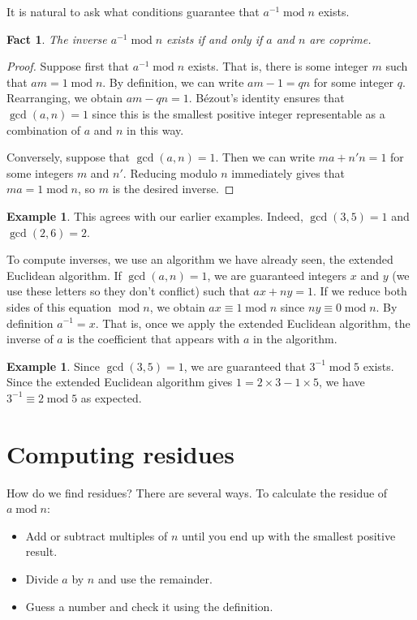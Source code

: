\documentclass{book}
\theoremstyle{plain}
\newtheorem{fact}[theorem]{Fact}
\theoremstyle{definition}
\newtheorem{example}[theorem]{Example}
\renewcommand{\mod}{\operatorname{mod}}
\renewcommand{\mod}{\operatorname{mod}}
\begin{document}
It is natural to ask what conditions guarantee that $a^{-1} \mod n$ exists.

\begin{fact}
The inverse $a^{-1} \mod n$ exists if and only if $a$ and $n$ are coprime.
\end{fact}

\begin{proof}
Suppose first that $a^{-1} \mod n$ exists. That is, there is some integer $m$ such that $am = 1 \mod n$. By definition, we can write $am-1=qn$ for some integer $q$. Rearranging, we obtain $am-qn=1$. B\'{e}zout's identity ensures that $\gcd(a,n) = 1$ since this is the smallest positive integer representable as a combination of $a$ and $n$ in this way.

Conversely, suppose that $\gcd(a,n) = 1$. Then we can write $ma+n'n=1$ for some integers $m$ and $n'$. Reducing modulo $n$ immediately gives that $ma = 1 \mod n$, so $m$ is the desired inverse.
\end{proof}

\begin{example}
This agrees with our earlier examples. Indeed, $\gcd(3,5) = 1$ and $\gcd(2,6) = 2$.
\end{example}

To compute inverses, we use an algorithm we have already seen, the extended Euclidean algorithm. If $\gcd(a,n) = 1$, we are guaranteed integers $x$ and $y$ (we use these letters so they don't conflict) such that $ax + ny = 1$. If we reduce both sides of this equation $\mod n$, we obtain $ax \equiv 1 \mod n$ since $ny \equiv 0 \mod n$. By definition $a^{-1} = x$. That is, once we apply the extended Euclidean algorithm, the inverse of $a$ is the coefficient that appears with $a$ in the algorithm.

\begin{example}
Since $\gcd(3,5) = 1$, we are guaranteed that $3^{-1} \mod 5$ exists. Since the extended Euclidean algorithm gives $1 = 2 \times 3 - 1 \times 5$, we have $3^{-1} \equiv 2 \mod 5$ as expected.
\end{example}

\section{Computing residues}
How do we find residues? There are several ways. To calculate the residue of $a \mod n$:
\begin{itemize}
\item Add or subtract multiples of $n$ until you end up with the smallest positive result.
\item Divide $a$ by $n$ and use the remainder.
\item Guess a number and check it using the definition.
\end{itemize}
\end{document}
